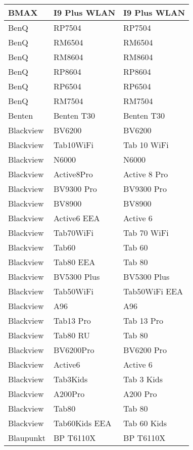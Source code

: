 \begin{tabularx}{\linewidth}{|l|X|X|}
        BMAX & I9 Plus WLAN & I9 Plus WLAN \\ \hline
        BenQ & RP7504 & RP7504 \\ \hline
        BenQ & RM6504 & RM6504 \\ \hline
        BenQ & RM8604 & RM8604 \\ \hline
        BenQ & RP8604 & RP8604 \\ \hline
        BenQ & RP6504 & RP6504 \\ \hline
        BenQ & RM7504 & RM7504 \\ \hline
        Benten & Benten T30 & Benten T30 \\ \hline
        Blackview & BV6200 & BV6200 \\ \hline
        Blackview & Tab10WiFi & Tab 10 WiFi \\ \hline
        Blackview & N6000 & N6000 \\ \hline
        Blackview & Active8Pro & Active 8 Pro \\ \hline
        Blackview & BV9300 Pro & BV9300 Pro \\ \hline
        Blackview & BV8900 & BV8900 \\ \hline
        Blackview & Active6 EEA & Active 6 \\ \hline
        Blackview & Tab70WiFi & Tab 70 WiFi \\ \hline
        Blackview & Tab60 & Tab 60 \\ \hline
        Blackview & Tab80 EEA & Tab 80 \\ \hline
        Blackview & BV5300 Plus & BV5300 Plus \\ \hline
        Blackview & Tab50WiFi & Tab50WiFi EEA \\ \hline
        Blackview & A96 & A96 \\ \hline
        Blackview & Tab13 Pro & Tab 13 Pro \\ \hline
        Blackview & Tab80 RU & Tab 80 \\ \hline
        Blackview & BV6200Pro & BV6200 Pro \\ \hline
        Blackview & Active6 & Active 6 \\ \hline
        Blackview & Tab3Kids & Tab 3 Kids \\ \hline
        Blackview & A200Pro & A200 Pro \\ \hline
        Blackview & Tab80 & Tab 80 \\ \hline
        Blackview & Tab60Kids EEA & Tab 60 Kids \\ \hline
        Blaupunkt & BP T6110X & BP T6110X \\ \hline

\end{tabularx}
